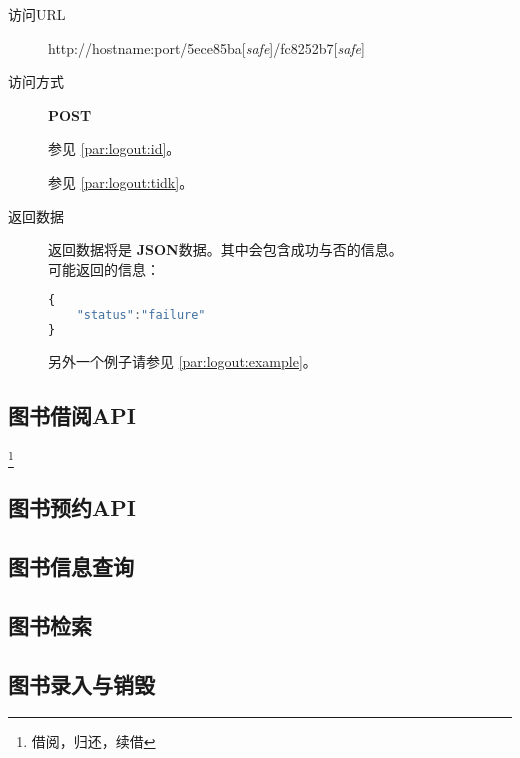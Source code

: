 \documentclass[UTF8]{ctexart}
\def\safe{[\textit{safe}]}
\def\POST{\textbf{POST}}
\def\bfJSON{\textbf{JSON}}
\def\viaurl#1{\item[访问URL] #1}
\def\viareq#1{\item[访问方式] #1}
\def\rtdata{\item[返回数据]}
\begin{document}
        
        
        
        
        \begin{description}
            \viaurl http://hostname:port/5ece85ba\safe/fc8252b7\safe
            
            \viareq \POST
            
            参见 \ref{par:logout:id}。
            
            参见 \ref{par:logout:tidk}。
            
            
            \rtdata 返回数据将是 \bfJSON 数据。其中会包含成功与否的信息。
            \\可能返回的信息：
            \begin{lstlisting}[language=JavaScript]
{
    "status":"failure"
}
            \end{lstlisting}
            另外一个例子请参见 \ref{par:logout:example}。
        \end{description}
        
        
        \subsection{图书借阅API}
        \footnote{借阅，归还，续借}
        \subsection{图书预约API}
        \subsection{图书信息查询}
        \subsection{图书检索}
        \subsection{图书录入与销毁}
\end{document}
